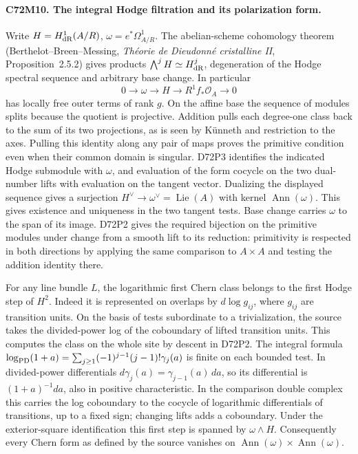 \paragraph{C72M10. The integral Hodge filtration and its polarization form.}
Write $H=H^1_{\rm dR}(A/R)$, $\omega=e^*\Omega^1_{A/R}$. The
abelian-scheme cohomology theorem (Berthelot--Breen--Messing,
\emph{Théorie de Dieudonné cristalline II}, Proposition~2.5.2)
gives products $\bigwedge^j H\simeq H^j_{\rm dR}$, degeneration of
the Hodge spectral sequence and arbitrary base change. In particular
\[
 0\longrightarrow\omega\longrightarrow H
 \longrightarrow R^1 f_*\mathcal O_A\longrightarrow0
\]
has locally free outer terms of rank $g$. On the affine base the
sequence of modules splits because the quotient is projective.
Addition pulls each degree-one class back to the sum of its two
projections, as is seen by Künneth and restriction to the axes.
Pulling this identity along any pair of maps proves the primitive
condition even when their common domain is singular.
D72P3 identifies the indicated Hodge submodule with $\omega$, and
evaluation of the form cocycle on the two dual-number lifts with
evaluation on the tangent vector. Dualizing the displayed sequence
gives a surjection $H^\vee\to\omega^\vee=\operatorname{Lie}(A)$
with kernel $\operatorname{Ann}(\omega)$. This gives existence and
uniqueness in the two tangent tests. Base change carries $\omega$
to the span of its image. D72P2 gives the required bijection on the
primitive modules under change from a smooth lift to its reduction:
primitivity is respected in both directions by applying the same
comparison to $A\times A$ and testing the addition identity there.

For any line bundle $L$, the logarithmic first Chern class belongs
to the first Hodge step of $H^2$. Indeed it is represented on
overlaps by $d\log g_{ij}$, where $g_{ij}$ are transition units.
On the basis of tests subordinate to a trivialization, the
source takes the divided-power log of the coboundary of lifted
transition units. This computes the class on the whole site by
descent in D72P2. The integral formula
$\log_{\rm PD}(1+a)=\sum_{j\ge1}(-1)^{j-1}(j-1)!\gamma_j(a)$
is finite on each bounded test. In divided-power differentials
$d\gamma_j(a)=\gamma_{j-1}(a)\,da$, so its differential is
$(1+a)^{-1}da$, also in positive characteristic. In the comparison
double complex this carries the log coboundary to the cocycle of
logarithmic differentials of transitions, up to a fixed sign;
changing lifts adds a coboundary. Under the exterior-square identification this first
step is spanned by $\omega\wedge H$. Consequently every Chern form
as defined by the source vanishes on
$\operatorname{Ann}(\omega)\times\operatorname{Ann}(\omega)$.

